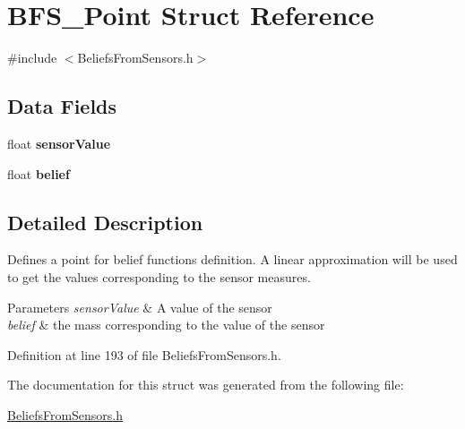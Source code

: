 \hypertarget{struct_b_f_s___point}{
\section{BFS\_\-Point Struct Reference}
\label{struct_b_f_s___point}
}


{\ttfamily \#include $<$BeliefsFromSensors.h$>$}

\subsection*{Data Fields}
\begin{DoxyCompactItemize}
\item 
\hypertarget{struct_b_f_s___point_a5b89170903f5d655f0e21e500138425b}{
float {\bfseries sensorValue}}
\label{struct_b_f_s___point_a5b89170903f5d655f0e21e500138425b}

\item 
\hypertarget{struct_b_f_s___point_a6e4486fe342cdfe9f04042b551e1651e}{
float {\bfseries belief}}
\label{struct_b_f_s___point_a6e4486fe342cdfe9f04042b551e1651e}

\end{DoxyCompactItemize}


\subsection{Detailed Description}
Defines a point for belief functions definition. A linear approximation will be used to get the values corresponding to the sensor measures. 
\begin{DoxyParams}{Parameters}
{\em sensorValue} & A value of the sensor \\
\hline
{\em belief} & the mass corresponding to the value of the sensor \\
\hline
\end{DoxyParams}


Definition at line 193 of file BeliefsFromSensors.h.



The documentation for this struct was generated from the following file:\begin{DoxyCompactItemize}
\item 
\hyperlink{_beliefs_from_sensors_8h}{BeliefsFromSensors.h}\end{DoxyCompactItemize}
